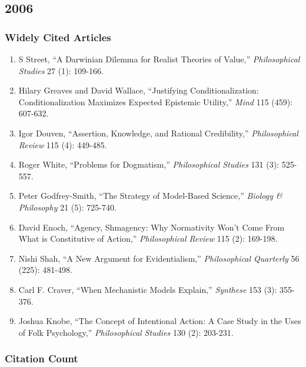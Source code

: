 \documentclass[
  10pt,
  letterpaper,
  DIV=11,
  numbers=noendperiod,
  twoside]{scrartcl}
\providecommand{\tightlist}{%
  \setlength{\itemsep}{0pt}\setlength{\parskip}{0pt}}\usepackage{longtable,booktabs,array}
\begin{document}
\newpage

\subsection{2006}\label{sec-s2006}

\subsubsection*{Widely Cited Articles}\label{widely-cited-articles-30}

\begin{enumerate}
\def\labelenumi{\arabic{enumi}.}
\tightlist
\item
  S Street, ``A Darwinian Dilemma for Realist Theories of Value,''
  \emph{Philosophical Studies} 27 (1): 109-166.
\item
  Hilary Greaves and David Wallace, ``Justifying Conditionalization:
  Conditionalization Maximizes Expected Epistemic Utility,'' \emph{Mind}
  115 (459): 607-632.
\item
  Igor Douven, ``Assertion, Knowledge, and Rational Credibility,''
  \emph{Philosophical Review} 115 (4): 449-485.
\item
  Roger White, ``Problems for Dogmatism,'' \emph{Philosophical Studies}
  131 (3): 525-557.
\item
  Peter Godfrey-Smith, ``The Strategy of Model-Based Science,''
  \emph{Biology \& Philosophy} 21 (5): 725-740.
\item
  David Enoch, ``Agency, Shmagency: Why Normativity Won't Come From What
  is Constitutive of Action,'' \emph{Philosophical Review} 115 (2):
  169-198.
\item
  Nishi Shah, ``A New Argument for Evidentialism,'' \emph{Philosophical
  Quarterly} 56 (225): 481-498.
\item
  Carl F. Craver, ``When Mechanistic Models Explain,'' \emph{Synthese}
  153 (3): 355-376.
\item
  Joshua Knobe, ``The Concept of Intentional Action: A Case Study in the
  Uses of Folk Psychology,'' \emph{Philosophical Studies} 130 (2):
  203-231.
\end{enumerate}

\subsubsection*{Citation Count}\label{sec-count-2006}
\end{document}
